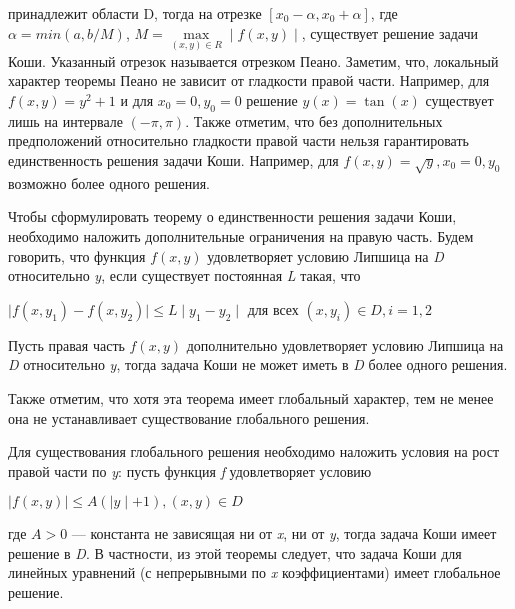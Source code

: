 \documentclass[11pt, a4paper]{article}
\begin{document}
принадлежит области D, тогда на отрезке $[x_{0}-\alpha ,x_{0}+\alpha]$, где $ \alpha=min{(a, b/M)}$, $ M= \max\limits_{(x,y)\in R} \mid f(x,y)\mid $, существует решение задачи Коши.
Указанный отрезок называется отрезком Пеано. Заметим, что, локальный характер теоремы Пеано не зависит от гладкости правой части. Например, для $ f(x,y)=y^{2}+1 $ и для $  x_{0}=0,y_{0}=0 $ решение $ y(x)=\tan(x)$ существует лишь на интервале $ (-\pi ,\pi )$. Также отметим, что без дополнительных предположений относительно гладкости правой части нельзя гарантировать единственность решения задачи Коши. Например, для $ f(x,y)=\sqrt {y},x_{0}=0,y_{0}$ возможно более одного решения.

Чтобы сформулировать теорему о единственности решения задачи Коши, необходимо наложить дополнительные ограничения на правую часть. Будем говорить, что функция $ f(x, y)$ удовлетворяет условию Липшица на \textit{D} относительно \textit{y}, если существует постоянная \textit{L} такая, что

$\mid f(x,y_{1})-f(x,y_{2})\mid \leq L\mid y_{1}-y_{2}\mid $
для всех $ (x,y_{i})\in D,i=1,2 $

Пусть правая часть $ f(x, y) $ дополнительно удовлетворяет условию Липшица на \textit{D} относительно \textit{y}, тогда задача Коши не может иметь в \textit{D} более одного решения.

Также отметим, что хотя эта теорема имеет глобальный характер, тем не менее она не устанавливает существование глобального решения.

Для существования глобального решения необходимо наложить условия на рост правой части по \textit{y}: пусть функция \textit{f} удовлетворяет условию

$ \mid f(x,y)\mid \leq A(\mid y\mid+1), (x,y)\in D $

где $ A>0 $ — константа не зависящая ни от \textit{x}, ни от \textit{y}, тогда задача Коши имеет решение в \textit{D}. В частности, из этой теоремы следует, что задача Коши для линейных уравнений (с непрерывными по \textit{x} коэффициентами) имеет глобальное решение.
\end{document}
